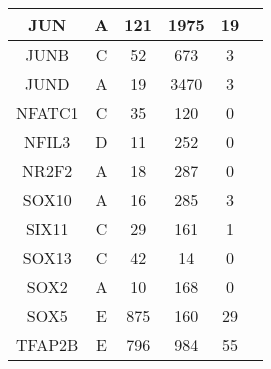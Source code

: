 \begin{table}[h!]
\begin{center}
\begin{tabular}{|c|c|c|c|c|c|}
        \hline
        \small{JUN} & \small{A} & \small{121} & \small{1975} & \small{19}\\
        \hline
        \small{JUNB} & \small{C} & \small{52} & \small{673} & \small{3}\\
        \hline
        \small{JUND} & \small{A} & \small{19} & \small{3470} & \small{3}\\
        \hline
        \small{NFATC1} & \small{C} & \small{35} & \small{120} & \small{0}\\
        \hline
        \small{NFIL3} & \small{D} & \small{11} & \small{252} & \small{0}\\
        \hline
        \small{NR2F2} & \small{A} & \small{18} & \small{287} & \small{0}\\
        \hline
        \small{SOX10} & \small{A} & \small{16} & \small{285} & \small{3}\\
        \hline
        \small{SIX11} & \small{C} & \small{29} & \small{161} & \small{1}\\
        \hline
        \small{SOX13} & \small{C} & \small{42} & \small{14} & \small{0}\\
        \hline
        \small{SOX2} & \small{A} & \small{10} & \small{168} & \small{0}\\
        \hline
        \small{SOX5} & \small{E} & \small{875} & \small{160} & \small{29}\\
        \hline
        \small{TFAP2B} & \small{E} & \small{796} & \small{984} & \small{55}\\
        \hline
        \end{tabular}
    \end{center}
\end{table}

